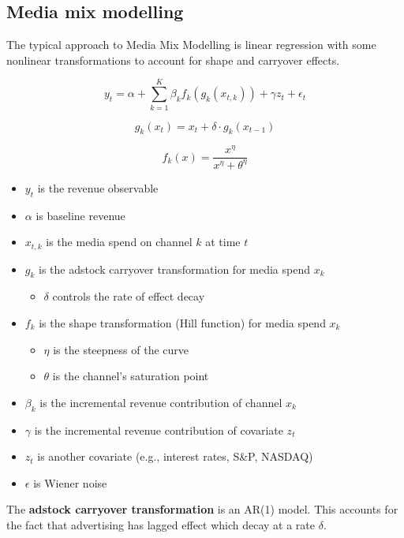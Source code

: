 \documentclass{article}
\begin{document}
\subsection{Media mix modelling}

The typical approach to Media Mix Modelling is linear regression with some nonlinear transformations to account for shape and carryover effects.

\[
y_t = \alpha + \sum_{k=1}^{K} \beta_k f_k(g_k(x_{t,k})) + \gamma z_t + \epsilon_t
\]

\[
g_k(x_t) = x_t + \delta \cdot g_k(x_{t-1})
\]

\[
f_k(x) = \frac{x^{\eta}}{x^{\eta} + \theta^{\eta}}
\]



\begin{itemize}[label=$\bullet$]
  \item \( y_t \) is the revenue observable
  \item \( \alpha \) is baseline revenue
  \item \( x_{t,k} \) is the media spend on channel \( k \) at time \( t \)
  \item \( g_k \) is the adstock carryover transformation for media spend \( x_k \)
    \begin{itemize}[label=$\circ$]
      \item \( \delta \) controls the rate of effect decay
    \end{itemize}
  \item \( f_k \) is the shape transformation (Hill function) for media spend \( x_k \)
    \begin{itemize}[label=$\circ$]
      \item \( \eta \) is the steepness of the curve
      \item \( \theta \) is the channel's saturation point
    \end{itemize}
  \item \( \beta_k \) is the incremental revenue contribution of channel \( x_k \)
  \item \( \gamma \) is the incremental revenue contribution of covariate \( z_t \)
  \item \( z_t \) is another covariate (e.g., interest rates, S\&P, NASDAQ)
  \item \( \epsilon \) is Wiener noise
\end{itemize}

The \textbf{adstock carryover transformation} is an AR(1) model. This accounts for the fact that advertising has lagged effect which decay at a rate $\delta$.
\end{document}
